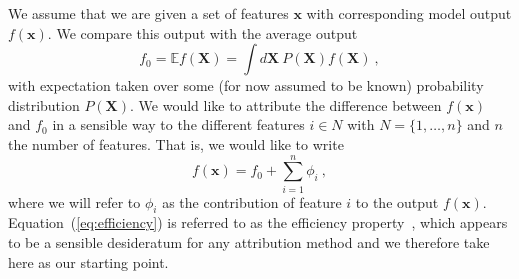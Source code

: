 \documentclass{article}
\newcommand{\vX}{\mathbf{X}}
\newcommand{\vx}{\mathbf{x}}
\newcommand{\expectation}{\mathbb{E}}
\newcommand{\contribution}{{\phi}}
\newcommand{\allfeatures}{{N}}
\begin{document}
We assume that we are given a set of features $\vx$ with corresponding model output $f(\vx)$. We compare this output with the average output
\[
f_0 = \expectation f(\vX) = \int d\vX \: P(\vX) f(\vX) \: ,
\]
with expectation taken over some (for now assumed to be known) probability distribution $P(\vX)$. We would like to attribute the difference between $f(\vx)$ and $f_0$ in a sensible way to the different features $i \in \allfeatures$ with $\allfeatures = \{1,\ldots,n\}$ and $n$ the number of features. That is, we would like to write
\begin{equation}
f(\vx) = f_0 + \sum_{i=1}^n \contribution_i \: ,
\label{eq:efficiency}
\end{equation}
where we will refer to $\contribution_i$ as the contribution of feature $i$ to the output $f(\vx)$. Equation~(\ref{eq:efficiency}) is referred to as the efficiency property~\cite{shapley1953value}, which appears to be a sensible desideratum for any attribution method and we therefore take here as our starting point.
\end{document}
